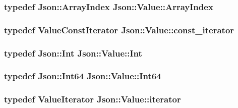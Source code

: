 \subsubsection[{\texorpdfstring{Array\+Index}{ArrayIndex}}]{\setlength{\rightskip}{0pt plus 5cm}typedef {\bf Json\+::\+Array\+Index} {\bf Json\+::\+Value\+::\+Array\+Index}}\hypertarget{classJson_1_1Value_a184a91566cccca7b819240f0d5561c7d}{}\label{classJson_1_1Value_a184a91566cccca7b819240f0d5561c7d}
\subsubsection[{\texorpdfstring{const\+\_\+iterator}{const_iterator}}]{\setlength{\rightskip}{0pt plus 5cm}typedef {\bf Value\+Const\+Iterator} {\bf Json\+::\+Value\+::const\+\_\+iterator}}\hypertarget{classJson_1_1Value_af92282ca92b58b320debd486afb7696a}{}\label{classJson_1_1Value_af92282ca92b58b320debd486afb7696a}
\subsubsection[{\texorpdfstring{Int}{Int}}]{\setlength{\rightskip}{0pt plus 5cm}typedef {\bf Json\+::\+Int} {\bf Json\+::\+Value\+::\+Int}}\hypertarget{classJson_1_1Value_abdf7a7ff73eb130ffcab28504ffdb405}{}\label{classJson_1_1Value_abdf7a7ff73eb130ffcab28504ffdb405}
\subsubsection[{\texorpdfstring{Int64}{Int64}}]{\setlength{\rightskip}{0pt plus 5cm}typedef {\bf Json\+::\+Int64} {\bf Json\+::\+Value\+::\+Int64}}\hypertarget{classJson_1_1Value_a1b86af9f85f0f1baa972c3319fa22695}{}\label{classJson_1_1Value_a1b86af9f85f0f1baa972c3319fa22695}
\subsubsection[{\texorpdfstring{iterator}{iterator}}]{\setlength{\rightskip}{0pt plus 5cm}typedef {\bf Value\+Iterator} {\bf Json\+::\+Value\+::iterator}}\hypertarget{classJson_1_1Value_a341cdf2e01f8b3c5b7317aa2f0768c53}{}\label{classJson_1_1Value_a341cdf2e01f8b3c5b7317aa2f0768c53}
